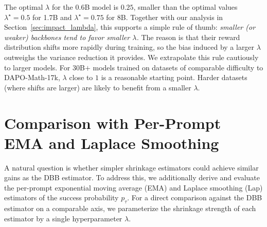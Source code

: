 \begin{table}[!htbp]
\centering
\setlength{\tabcolsep}{5pt}
\caption{Effect of the discount factor $\lambda$ of GRPO-DBB on in-distribution Acc@8 performance for Qwen3-0.6B-Base trained on DAPO-Math-17k. The best average performance is attained at $\lambda=0.25$.}
\label{tab:lambda_06B}
\end{table}

The optimal $\lambda$ for the 0.6B model is $0.25$, smaller than the optimal values $\lambda^\star=0.5$ for 1.7B and $\lambda^\star=0.75$ for 8B.
Together with our analysis in Section~\ref{sec:impact_lambda}, this supports a simple rule of thumb: \emph{smaller (or weaker) backbones tend to favor smaller $\lambda$.}
The reason is that their reward distribution shifts more rapidly during training, so the bias induced by a larger $\lambda$ outweighs the variance reduction it provides.
We extrapolate this rule cautiously to larger models.
For $30$B$+$ models trained on datasets of comparable difficulty to DAPO-Math-17k, $\lambda$ close to $1$ is a reasonable starting point.
Harder datasets (where shifts are larger) are likely to benefit from a smaller $\lambda$.
\FloatBarrier


\section{Comparison with Per-Prompt EMA and Laplace Smoothing}
\label{ap:ema_laplace}

A natural question is whether simpler shrinkage estimators could achieve similar gains as the DBB estimator.
To address this, we additionally derive and evaluate the per-prompt exponential moving average (EMA) and Laplace smoothing (Lap) estimators of the success probability $p_\tau$.
For a direct comparison against the DBB estimator on a comparable axis, we parameterize the shrinkage strength of each estimator by a single hyperparameter $\lambda$.


